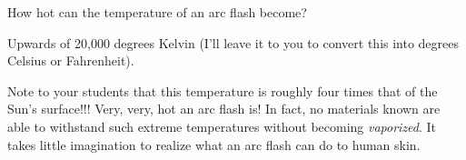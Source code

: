 

How hot can the temperature of an arc flash become?







Upwards of 20,000 degrees Kelvin (I'll leave it to you to convert this into degrees Celsius or Fahrenheit).







Note to your students that this temperature is roughly four times that of the Sun's surface!!!  Very, very, hot an arc flash is!  In fact, no materials known are able to withstand such extreme temperatures without becoming {\it vaporized}.  It takes little imagination to realize what an arc flash can do to human skin.




